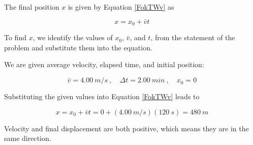 \documentclass[main-ap-physics.tex]{subfiles}
\begin{document}
\begin{center}
\end{center}

The final position $x$ is given by Equation \eqref{FokTWv} as

\begin{equation*}
    x = x_0 + \bar{v} t
\end{equation*}

To find $x$, we identify the values of $x_0$, $\bar{v}$, and $t$, from the statement of the problem and substitute them into the equation.

\vspace{1em}

We are given average velocity, elapsed time, and initial position: 

\begin{equation*}
    \bar{v} = \SI{4.00}{m/s}\ , \quad \Delta t = \SI{2.00}{min}\ , \quad x_0 = 0
\end{equation*}

Substituting the given values into Equation \eqref{FokTWv} leads to 

\begin{equation*}
    x = x_0 + \bar{v} t = 0 + \left(\SI{4.00}{m/s}\right) \left(\SI{120}{s}\right) = \SI{480}{m}
\end{equation*}

Velocity and final displacement are both positive, which means they are in the same direction.
\end{document}
